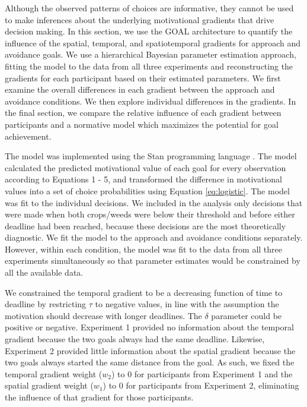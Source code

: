 \documentclass[a4paper,doc,natbib,donotrepeattitle]{apa6}
\begin{document}
Although the observed patterns of choices are informative, they cannot be used to make inferences about the underlying motivational gradients that drive decision making. In this section, we use the GOAL architecture to quantify the influence of the spatial, temporal, and spatiotemporal gradients for approach and avoidance goals. We use a hierarchical Bayesian parameter estimation approach, fitting the model to the data from all three experiments and reconstructing the gradients for each participant based on their estimated parameters. We first examine the overall differences in each gradient between the approach and avoidance conditions. We then explore individual differences in the gradients. In the final section, we compare the relative influence of each gradient between participants and a normative model which maximizes the potential for goal achievement.

The model was implemented using the Stan programming language \citep{Carpenter2017}. The model calculated the predicted motivational value of each goal for every observation according to Equations 1 - 5, and transformed the difference in motivational values into a set of choice probabilities using Equation \ref{eq:logistic}. The model was fit to the individual decisions. We included in the analysis only decisions that were made when both crops/weeds were below their threshold and before either deadline had been reached, because these decisions are the most theoretically diagnostic. We fit the model to the approach and avoidance conditions separately. However, within each condition, the model was fit to the data from all three experiments simultaneously so that parameter estimates would be constrained by all the available data.

We constrained the temporal gradient to be a decreasing function of time to deadline by restricting $\tau$ to negative values, in line with the assumption the motivation should decrease with longer deadlines. The $\delta$ parameter could be positive or negative. Experiment 1 provided no information about the temporal gradient because the two goals always had the same deadline. Likewise, Experiment 2 provided little information about the spatial gradient because the two goals always started the same distance from the goal. As such, we fixed the temporal gradient weight ($w_2$) to 0 for participants from Experiment 1 and the spatial gradient weight ($w_1$) to 0 for participants from Experiment 2, eliminating the influence of that gradient for those participants.
\end{document}

